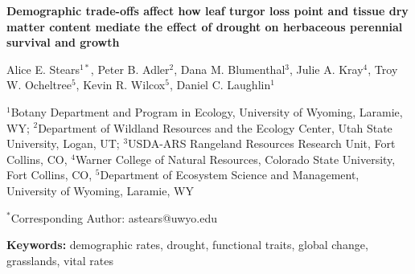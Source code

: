 \documentclass[12pt, letterpaper]{article}
\begin{document}
\begin{flushleft}
\Large{\textbf{Demographic trade-offs affect how leaf turgor loss point and tissue dry matter content mediate the effect of drought on herbaceous perennial survival and growth}} 

\normalsize{Alice E. Stears$^{1*}$, Peter B. Adler$^2$, Dana M. Blumenthal$^3$, Julie A. Kray$^4$, Troy W. Ocheltree$^5$, Kevin R. Wilcox$^5$, Daniel C. Laughlin$^1$}

\small{$^1$Botany Department and Program in Ecology, University of Wyoming, Laramie, WY; $^2$Department of Wildland Resources and the Ecology Center, Utah State University, Logan, UT; $^3$USDA-ARS Rangeland Resources Research Unit, Fort Collins, CO, $^4$Warner College of Natural Resources, Colorado State University, Fort Collins, CO, $^5$Department of Ecosystem Science and Management, University of Wyoming, Laramie, WY}

\small{$^*$Corresponding Author: astears@uwyo.edu}

\end{flushleft}
\textbf{Keywords:} demographic rates, drought, functional traits, global change, grasslands, vital rates
\end{document}
